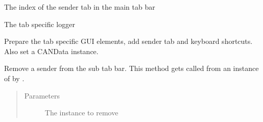 \documentclass[letterpaper,10pt,english]{sphinxmanual}
\begin{document}
\begin{fulllineitems}
\begin{fulllineitems}
\end{fulllineitems}


\begin{fulllineitems}
\label{\detokenize{src:src.SenderTab.SenderTab.indexInMainTabBar}}
The index of the sender tab in the main tab bar

\end{fulllineitems}


\begin{fulllineitems}
\label{\detokenize{src:src.SenderTab.SenderTab.labelInterfaceValue}}
\end{fulllineitems}


\begin{fulllineitems}
\label{\detokenize{src:src.SenderTab.SenderTab.logger}}
The tab specific logger

\end{fulllineitems}


\begin{fulllineitems}
\label{\detokenize{src:src.SenderTab.SenderTab.prepareUI}}
Prepare the tab specific GUI elements, add sender tab and keyboard shortcuts. Also set a CANData instance.

\end{fulllineitems}


\begin{fulllineitems}
\label{\detokenize{src:src.SenderTab.SenderTab.removeSender}}
Remove a sender from the sub tab bar. This method gets called from an instance of
{\hyperref[\detokenize{src:src.SenderTabElement.SenderTabElement}]{}} by {\hyperref[\detokenize{src:src.SenderTabElement.SenderTabElement.removeSender}]{}}.
\begin{quote}\begin{description}
\item[{Parameters}] \leavevmode
{} \textendash{} The {\hyperref[\detokenize{src:src.SenderTabElement.SenderTabElement}]{}} instance to remove


\end{description}
\end{quote}
\end{fulllineitems}
\end{fulllineitems}
\end{document}
